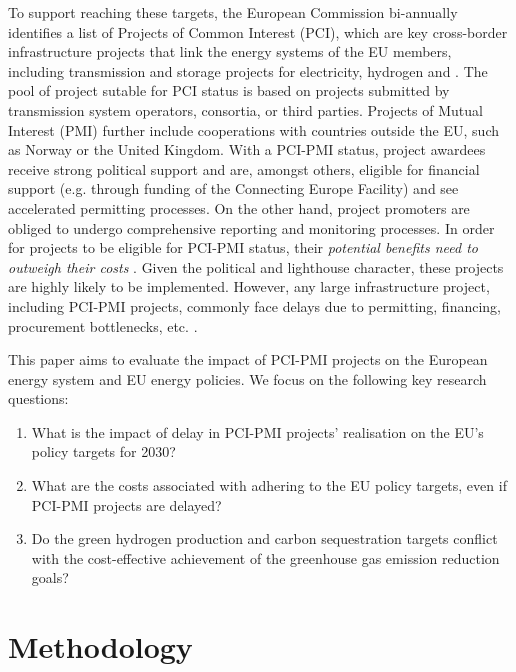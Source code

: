 \documentclass[final,5p,times,twocolumn]{elsarticle}
\let\autocite\cite
\begin{document}
To support reaching these targets, the European Commission bi-annually identifies a list of Projects of Common Interest (PCI), which are key cross-border infrastructure projects that link the energy systems of the EU members, including transmission and storage projects for electricity, hydrogen and  \autocite{europeancommissionCommissionDelegatedRegulation2023}. 
The pool of project sutable for PCI status is based on projects submitted by transmission system operators, consortia, or third parties. Projects of Mutual Interest (PMI) further include cooperations with countries outside the EU, such as Norway or the United Kingdom. With a PCI-PMI status, project awardees receive strong political support and are, amongst others, eligible for financial support (e.g. through funding of the Connecting Europe Facility) and see accelerated permitting processes. On the other hand, project promoters are obliged to undergo comprehensive reporting and monitoring processes. 
In order for projects to be eligible for PCI-PMI status, their \textit{potential benefits need to outweigh their costs} \autocite{europeancommissionCommissionDelegatedRegulation2023}. Given the political and lighthouse character, these projects are highly likely to be implemented. However, any large infrastructure project, including PCI-PMI projects, commonly face delays due to permitting, financing, procurement bottlenecks, etc. \autocite{acerConsolidatedReportProgress2023}.

This paper aims to evaluate the impact of PCI-PMI projects on the European energy system and EU energy policies. We focus on the following key research questions:

\begin{enumerate} 
  \item What is the impact of delay in PCI-PMI projects' realisation on the EU's policy targets for 2030?
  \item What are the costs associated with adhering to the EU policy targets, even if PCI-PMI projects are delayed? 
  \item Do the green hydrogen production and carbon sequestration targets conflict with the cost-effective achievement of the greenhouse gas emission reduction goals? 
\end{enumerate}

\section{Methodology}
\label{sec:methodology}
\end{document}
